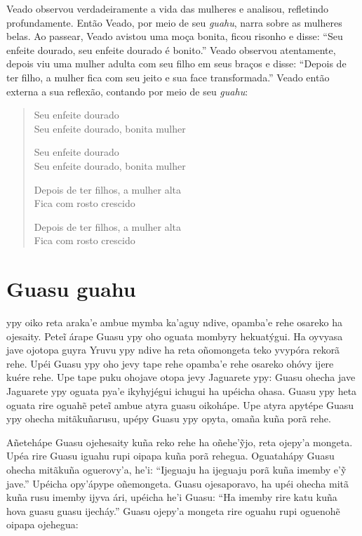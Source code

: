 Veado observou verdadeiramente a vida das mulheres e analisou,
refletindo profundamente. Então Veado, por meio de seu \textit{guahu},
narra sobre as mulheres belas. Ao passear, Veado avistou uma moça
bonita, ficou risonho e disse: ``Seu enfeite dourado, seu enfeite
dourado é bonito.'' Veado observou atentamente, depois viu uma mulher
adulta com seu filho em seus braços e disse: ``Depois de ter filho, a
mulher fica com seu jeito e sua face transformada.'' Veado então externa
a sua reflexão, contando por meio de seu \textit{guahu}:

\begin{verse}
Seu enfeite dourado\\
Seu enfeite dourado, bonita mulher

Seu enfeite dourado\\
Seu enfeite dourado, bonita mulher

\pagebreak
Depois de ter filhos, a mulher alta\\
Fica com rosto crescido

Depois de ter filhos, a mulher alta\\
Fica com rosto crescido
\end{verse}

\chapter{Guasu guahu}

 ypy oiko reta araka'e ambue mymba ka'aguy ndive, opamba'e rehe
osareko ha ojesaity. Peteĩ árape Guasu ypy oho oguata mombyry
hekuatýgui. Ha oyvyasa jave ojotopa guyra Yruvu ypy ndive ha reta
oñomongeta teko yvypóra rekorã rehe. Upéi Guasu ypy oho jevy tape rehe
opamba'e rehe osareko ohóvy ijere kuére rehe. Upe tape puku ohojave
otopa jevy Jaguarete ypy: Guasu ohecha jave Jaguarete ypy oguata pya'e
ikyhyjégui ichugui ha upéicha ohasa. Guasu ypy heta oguata rire oguahẽ
peteĩ ambue atyra guasu oikohápe. Upe atyra apytépe Guasu ypy ohecha
mitãkuñarusu, upépy Guasu ypy opyta, omaña kuña porã rehe.

Añetehápe Guasu ojehesaity kuña reko rehe ha oñehe'ỹjo, reta ojepy'a
mongeta. Upéa rire Guasu iguahu rupi oipapa kuña porã rehegua.
Oguatahápy Guasu ohecha mitãkuña oguerovy'a, he'i: ``Ijeguaju ha
ijeguaju porã kuña imemby e'ỹ jave.'' Upéicha opy'ápype oñemongeta.
Guasu ojesaporavo, ha upéi ohecha mitã kuña rusu imemby ijyva ári,
upéicha he'i Guasu: ``Ha imemby rire katu kuña hova guasu guasu
ijecháy.'' Guasu ojepy'a mongeta rire oguahu rupi oguenohẽ oipapa
ojehegua:

